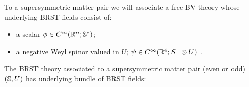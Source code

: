 \documentclass[10pt, oneside]{article}
\begin{document}
To a supersymmetric matter pair we will associate a free BV theory whose underlying BRST fields consist of:
\begin{itemize}
\item a scalar $\phi \in C^\infty(\mathbb R^n ; \mathbb S^*)$;
\item a negative Weyl spinor valued in $U$; $\psi \in C^\infty(\mathbb R^4 ; S_- \otimes U)$ .
\end{itemize}

\begin{definition}
The BRST theory associated to a supersymmetric matter pair (even or odd) $(\mathbb S, U)$ has underlying bundle of BRST fields:
\end{definition}
\end{document}
